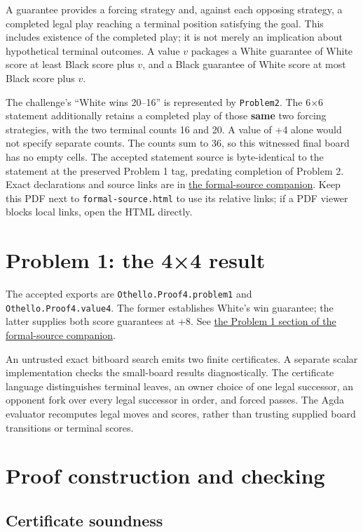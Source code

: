 \documentclass[10pt,a4paper]{article}
\newcommand{\code}[1]{\nolinkurl{#1}}
\begin{document}
A guarantee provides a forcing strategy and, against each opposing strategy, a completed legal play reaching a terminal position satisfying the goal. This includes existence of the completed play; it is not merely an implication about hypothetical terminal outcomes. A value $v$ packages a White guarantee of White score at least Black score plus $v$, and a Black guarantee of White score at most Black score plus $v$.

The challenge's “White wins 20–16” is represented by \code{Problem2}. The 6×6 statement additionally retains a completed play of those \textbf{same} two forcing strategies, with the two terminal counts 16 and 20. A value of +4 alone would not specify separate counts. The counts sum to 36, so this witnessed final board has no empty cells. The accepted statement source is byte-identical to the statement at the preserved Problem 1 tag, predating completion of Problem 2. Exact declarations and source links are in \href{formal-source.html}{the formal-source companion}. Keep this PDF next to \code{formal-source.html} to use its relative links; if a PDF viewer blocks local links, open the HTML directly.

\section{Problem 1: the 4×4 result}

The accepted exports are \code{Othello.Proof4.problem1} and \code{Othello.Proof4.value4}. The former establishes White's win guarantee; the latter supplies both score guarantees at +8. See \href{formal-source.html\#p1-problem1}{the Problem 1 section of the formal-source companion}.

An untrusted exact bitboard search emits two finite certificates. A separate scalar implementation checks the small-board results diagnostically. The certificate language distinguishes terminal leaves, an owner choice of one legal successor, an opponent fork over every legal successor in order, and forced passes. The Agda evaluator recomputes legal moves and scores, rather than trusting supplied board transitions or terminal scores.

\section{Proof construction and checking}

\subsection{Certificate soundness}
\end{document}
